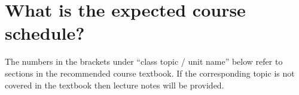 \documentclass[11pt]{article}
\begin{document}

\section{What is the expected course schedule?}

The numbers in the brackets under ``class topic / unit name'' below refer to sections in the recommended course textbook. If the corresponding topic is not covered in the textbook then lecture notes will be provided.




\end{document}

